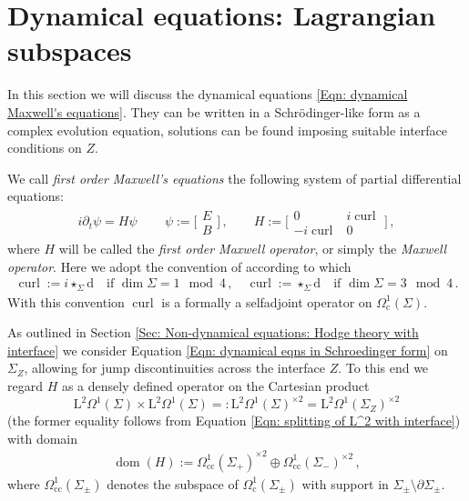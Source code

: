 \section{Dynamical equations: Lagrangian subspaces}\label{Sec: dynamical equations: boundary triples}
In this section we will discuss the dynamical equations \eqref{Eqn: dynamical Maxwell's equations}. They can be written in a Schr\"odinger-like form as a complex evolution equation, solutions can be found imposing suitable interface conditions on $Z$.
\begin{Definition}
	We call \emph{first order Maxwell's equations} the following system of partial differential equations:
	\begin{align}\label{Eqn: dynamical eqns in Schroedinger form}
	i\partial_t\psi=H\psi\,\qquad
	\psi:=\bigg[\begin{matrix}E\\B\end{matrix}\bigg]\,,\qquad
	H:=\bigg[\begin{matrix}0&i\operatorname{curl}\\-i\operatorname{curl}&0\end{matrix}\bigg]\,,
	\end{align}
	where $H$ will be called the \emph{first order Maxwell operator}, or simply the \emph{Maxwell operator}. Here we adopt the convention of \parencite{Baer-19} according to which
	\begin{align}\label{Eqn: curl convention}
	\operatorname{curl}:=i\star_\Sigma\mathrm{d}\quad\textrm{if }\dim\Sigma=1\mod 4\,,\quad
	\operatorname{curl}:=\star_\Sigma\mathrm{d}\quad\textrm{if }\dim\Sigma=3\mod 4\,.
	\end{align}
	With this convention $\operatorname{curl}$ is a formally a selfadjoint operator on $\Omega_\mathrm{c}^1(\Sigma)$.
\end{Definition}



As outlined in Section \ref{Sec: Non-dynamical equations: Hodge theory with interface} we consider Equation \eqref{Eqn: dynamical eqns in Schroedinger form} on $\Sigma_Z$, allowing for jump discontinuities across the interface $Z$. To this end we regard $H$ as a densely defined operator on the Cartesian product \begin{equation}\label{Eqn: L^2 with H}
	\mathrm{L}^2\Omega^1(\Sigma)\times \mathrm{L}^2\Omega^1(\Sigma)=:\mathrm{L}^2\Omega^1(\Sigma)^{\times 2}=\mathrm{L}^2\Omega^1(\Sigma_Z)^{\times 2}
\end{equation} (the former equality follows from Equation \eqref{Eqn: splitting of L^2 with interface}) with domain
\begin{align}\label{Eqn: curl-Hamiltonian domain}
	\operatorname{dom}(H):=
	\Omega_\mathrm{cc}^1(\Sigma_+)^{\times 2}\oplus \Omega_\mathrm{cc}^1(\Sigma_-)^{\times 2}\,,
\end{align}
where $\Omega_\mathrm{cc}^1(\Sigma_\pm)$ denotes the subspace of $\Omega_\mathrm{c}^1(\Sigma_\pm)$ with support in $\Sigma_\pm\setminus\partial\Sigma_\pm$.\\

